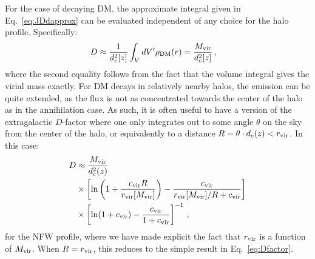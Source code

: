 For the case of decaying DM, the approximate integral given in Eq.~\ref{eq:JDdapprox} can be evaluated independent of any choice for the halo profile.   Specifically:
\begin{equation}\begin{aligned}
D &\approx \frac{1}{d_c^2[z]} \int_V dV' \rho_{\rm DM}(r) = \frac{M_{\rm vir}}{d_c^2[z]}\,,
\label{eq:Dfactor}
\end{aligned}\end{equation}
where the second equality follows from the fact that the volume integral gives the virial mass exactly.
For DM decays in relatively nearby halos, the emission can be quite extended, as the flux is not as concentrated towards the center of the halo as in the annihilation case.  As such, it is often useful to have a version of the extragalactic $D$-factor where one only integrates out to some angle $\theta$ on the sky from the center of the halo, or equivalently to a distance $R = \theta \cdot d_c(z) < r_{\rm vir}$. In this case:\begin{align}
D &\approx \frac{M_{\rm vir}}{d_c^2(z)} \\
&\times \left[ \ln \left( 1 + \frac{c_{\rm vir} R}{r_{\rm vir}[M_{\rm vir}]} \right) - \frac{c_{\rm vir}}{r_{\rm vir}[M_{\rm vir}]/R + c_{\rm vir}} \right] \notag \\
&\times \left[ \ln (1 + c_{\rm vir}) - \frac{c_{\rm vir}}{1+c_{\rm vir}} \right]^{-1}\,, \notag
\end{align}
for the NFW profile, where we have made explicit the fact that $r_{\rm vir}$ is a function of $M_{\rm vir}$.  When $R=r_{\rm vir}$, this reduces to the simple result in Eq.~\ref{eq:Dfactor}.




